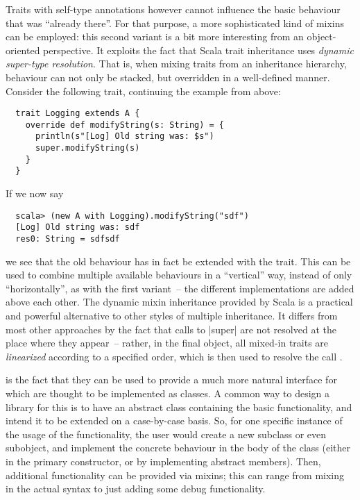Traits with self-type annotations however cannot influence the basic behaviour that was
\enquote{already there}. For that purpose, a more sophisticated kind of mixins can be employed: this
second variant is a bit more interesting from an object-oriented perspective. It exploits the fact
that Scala trait inheritance uses \emph{dynamic super-type resolution}. That is, when mixing traits
from an inheritance hierarchy, behaviour can not only be stacked, but overridden in a well-defined
manner. Consider the following trait, continuing the example from above:
\begin{lstlisting}
  trait Logging extends A {
    override def modifyString(s: String) = { 
      println(s"[Log] Old string was: $s")
      super.modifyString(s)
    }
  }
\end{lstlisting}%
If we now say
\begin{lstlisting}
  scala> (new A with Logging).modifyString("sdf")
  [Log] Old string was: sdf
  res0: String = sdfsdf
\end{lstlisting}
we see that the old behaviour has in fact be extended with the trait. This can be used to combine
multiple available behaviours in a \enquote{vertical} way, instead of only \enquote{horizontally},
as with the first variant~-- the different implementations are added above each other. The dynamic
mixin inheritance provided by Scala is a practical and powerful alternative to other styles of
multiple inheritance. It differs from most other approaches by the fact that calls to |super| are
not resolved at the place where they appear~-- rather, in the final object, all mixed-in traits are
\emph{linearized} according to a specified order, which is then used to resolve the call
\cite[][Chapter~12.6]{odersky2008:programming}.

 is the fact that they can be used to
provide a much more natural interface for \dsls{} which are thought to be implemented as classes. A
common way to design a library for this is to have an abstract class containing the basic
functionality, and intend it to be extended on a case-by-case basis. So, for one specific instance
of the usage of the functionality, the user would create a new subclass or even subobject, and
implement the concrete behaviour in the body of the class (either in the primary constructor, or by
implementing abstract members). Then, additional functionality can be provided via mixins; this can
range from mixing in the actual \dsl{} syntax to just adding some debug functionality.

